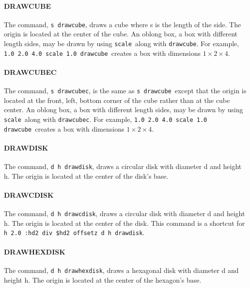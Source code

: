 \documentclass[11pt,twoside]{book}
\begin{document}
\paragraph{DRAWCUBE} The command, {\tt s drawcube},
draws a cube where s is the length of the side.  The origin is
located at the center of the cube.  An oblong box, a box with
different length sides, may be drawn by using {\tt scale}\ along
with {\tt drawcube}.  For example, {\tt 1.0 2.0 4.0 scale 1.0
drawcube}\ creates a box with dimensions $1\times 2\times 4$.

\paragraph{DRAWCUBEC} The command, {\tt s drawcubec}, is the same as {\tt s drawcube}\
except that the origin is located at the front, left, bottom corner of the cube rather
than at the cube center.  An oblong box, a box with different length sides, may be drawn
by using {\tt scale}\ along with {\tt drawcubec}.  For example, {\tt 1.0 2.0 4.0 scale 1.0
drawcube}\ creates a box with dimensions $1\times 2\times 4$.

\paragraph{DRAWDISK} The command, {\tt d h drawdisk},
draws a circular disk with diameter d and height h. The origin is
located at the center of the disk's base.\vspace{0.25in}

\paragraph{DRAWCDISK} The command, {\tt d h drawcdisk},
draws a circular disk with diameter d and height h. The origin is
located at the center of the disk. This command is a shortcut
for {\tt h 2.0 :hd2 div \$hd2 offsetz d h drawdisk}.\vspace{0.25in}

\paragraph{DRAWHEXDISK} The command, {\tt d h drawhexdisk},
draws a hexagonal disk with diameter d and height h.  The origin
is located at the center of the hexagon's base.\vspace{0.25in}
\end{document}
